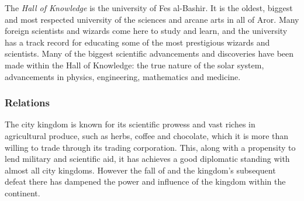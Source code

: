 The \emph{Hall of Knowledge} is the university of Fes al-Bashir. It is the
oldest, biggest and most respected university of the sciences and arcane arts
in all of Aror. Many foreign scientists and wizards come here to study and
learn, and the university has a track record for educating some of the most
prestigious wizards and scientists. Many of the biggest scientific
advancements and discoveries have been made within the Hall of Knowledge: the
true nature of the solar system, advancements in physics, engineering,
mathematics and medicine.

\subsubsection*{Relations}

The city kingdom is known for its scientific prowess and vast riches in
agricultural produce, such as herbs, coffee and chocolate, which it is more
than willing to trade through its trading corporation. This, along with a
propensity to lend military and scientific aid, it has achieves a good
diplomatic standing with almost all city kingdoms. However the fall of
 and the kingdom's subsequent defeat there has dampened
the power and influence of the kingdom within the continent.
